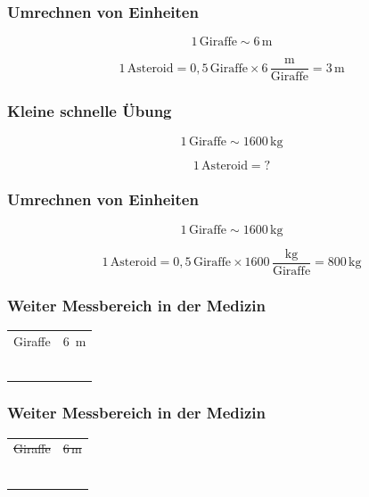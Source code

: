 \documentclass{beamer}
\begin{document}
\begin{frame}
\frametitle{Umrechnen von Einheiten}

\[1\, \text{Giraffe} \sim 6\,\text{m} \]

\[
1\,\text{Asteroid} = 0,5\, \text{Giraffe} \times 6\, \frac{\text{m}}{\text{Giraffe}} = 3\,\text{m}
\]


\end{frame}


\begin{frame}
\frametitle{Kleine schnelle Übung}

\[1\, \text{Giraffe} \sim 1600\,\text{kg} \]

\[
1\,\text{Asteroid} =  ?
\]


\end{frame}


\begin{frame}
\frametitle{Umrechnen von Einheiten}

\[1\, \text{Giraffe} \sim 1600\,\text{kg} \]

\[
1\,\text{Asteroid} =  0,5\, \text{Giraffe} \times 1600\, \frac{\text{kg}}{\text{Giraffe}} = 800\,\text{kg}
\]


\end{frame}




\begin{frame}
\frametitle{Weiter Messbereich in der Medizin}
\begin{tabular}{ll}
Giraffe & \SI{6}{m} \\
\\
\\
\\
\\
\\
\\
\end{tabular}
\end{frame}

\begin{frame}
\frametitle{Weiter Messbereich in der Medizin}
\begin{tabular}{ll}
\sout{Giraffe} & \sout{6\,m} \\
\\
\\
\\
\\
\\
\\
\end{tabular}
\end{frame}
 
\end{document}
